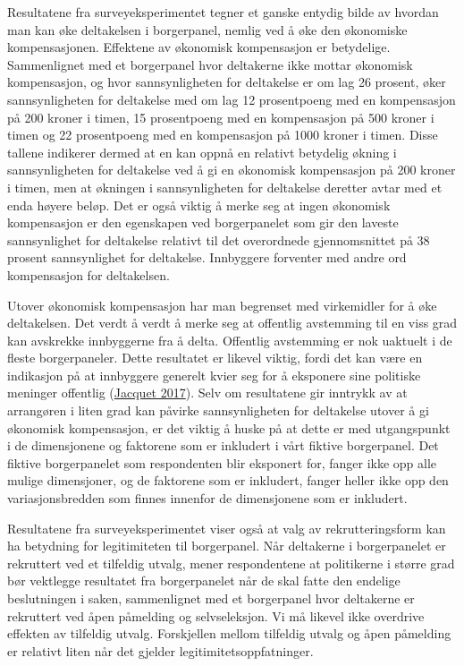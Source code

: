 \documentclass[
  12pt,
  a4paper, 12pt]{article}
\begin{document}
Resultatene fra surveyeksperimentet tegner et ganske entydig bilde av hvordan man kan øke deltakelsen i borgerpanel, nemlig ved å øke den økonomiske kompensasjonen. Effektene av økonomisk kompensasjon er betydelige. Sammenlignet med et borgerpanel hvor deltakerne ikke mottar økonomisk kompensasjon, og hvor sannsynligheten for deltakelse er om lag 26 prosent, øker sannsynligheten for deltakelse med om lag 12 prosentpoeng med en kompensasjon på 200 kroner i timen, 15 prosentpoeng med en kompensasjon på 500 kroner i timen og 22 prosentpoeng med en kompensasjon på 1000 kroner i timen. Disse tallene indikerer dermed at en kan oppnå en relativt betydelig økning i sannsynligheten for deltakelse ved å gi en økonomisk kompensasjon på 200 kroner i timen, men at økningen i sannsynligheten for deltakelse deretter avtar med et enda høyere beløp. Det er også viktig å merke seg at ingen økonomisk kompensasjon er den egenskapen ved borgerpanelet som gir den laveste sannsynlighet for deltakelse relativt til det overordnede gjennomsnittet på 38 prosent sannsynlighet for deltakelse. Innbyggere forventer med andre ord kompensasjon for deltakelsen.

Utover økonomisk kompensasjon har man begrenset med virkemidler for å øke deltakelsen. Det verdt å verdt å merke seg at offentlig avstemming til en viss grad kan avskrekke innbyggerne fra å delta. Offentlig avstemming er nok uaktuelt i de fleste borgerpaneler. Dette resultatet er likevel viktig, fordi det kan være en indikasjon på at innbyggere generelt kvier seg for å eksponere sine politiske meninger offentlig (\protect\hyperlink{ref-jacquet_explaining_2017}{Jacquet 2017}). Selv om resultatene gir inntrykk av at arrangøren i liten grad kan påvirke sannsynligheten for deltakelse utover å gi økonomisk kompensasjon, er det viktig å huske på at dette er med utgangspunkt i de dimensjonene og faktorene som er inkludert i vårt fiktive borgerpanel. Det fiktive borgerpanelet som respondenten blir eksponert for, fanger ikke opp alle mulige dimensjoner, og de faktorene som er inkludert, fanger heller ikke opp den variasjonsbredden som finnes innenfor de dimensjonene som er inkludert.

Resultatene fra surveyeksperimentet viser også at valg av rekrutteringsform kan ha betydning for legitimiteten til borgerpanel. Når deltakerne i borgerpanelet er rekruttert ved et tilfeldig utvalg, mener respondentene at politikerne i større grad bør vektlegge resultatet fra borgerpanelet når de skal fatte den endelige beslutningen i saken, sammenlignet med et borgerpanel hvor deltakerne er rekruttert ved åpen påmelding og selvseleksjon. Vi må likevel ikke overdrive effekten av tilfeldig utvalg. Forskjellen mellom tilfeldig utvalg og åpen påmelding er relativt liten når det gjelder legitimitetsoppfatninger.
\end{document}

